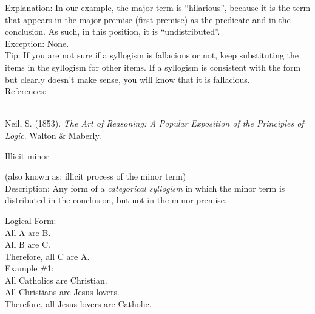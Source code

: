 \documentclass[a4paper,12pt,single,pdftex]{scrartcl}
\begin{document}
    
      Explanation: In our example, the major term is “hilarious”, because it is the term that appears in the major premise (first premise) as the predicate and in the conclusion.  As such, in this position, it is “undistributed”.
    \\

    
      Exception: None.
    \\

    
      Tip: If you are not sure if a syllogism is fallacious or not, keep substituting the items in the syllogism for other items. If a syllogism is consistent with the form but clearly doesn’t make sense, you will know that it is fallacious.
    \\

    References:

    
      
        
      \\

      
        
          Neil, S. (1853). {\it The Art of Reasoning: A Popular Exposition of the Principles of Logic}. Walton \& Maberly.
        
      
    
  

Illicit minor
    
      (also known as: illicit process of the minor term)
    \\

  
    Description: Any form of a {\it categorical syllogism} in which the minor term is distributed in the conclusion, but not in the minor premise.

    
      Logical Form:
    \\

    
      All A are B.
    \\

    
      All B are C.
    \\

    
      Therefore, all C are A.
    \\

    
      Example \#1:
    \\

    
      All Catholics are Christian.
    \\

    
      All Christians are Jesus lovers.
    \\

    
      Therefore, all Jesus lovers are Catholic.
    \\
\end{document}
